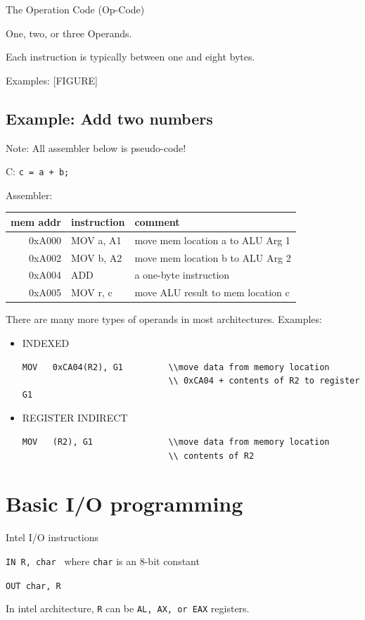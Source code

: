\documentclass{article}	%
\begin{document}
The Operation Code (Op-Code)

One, two, or three Operands.

Each instruction is typically between one and eight bytes.

Examples:           [FIGURE]

\subsection{Example: Add two numbers}
Note:  All assembler below is pseudo-code!

C: {\tt c = a + b;}

Assembler:
\begin{tabular}{|r|l|l|}
\hline
mem addr        & instruction 	& comment\\
\hline
0xA000          & MOV  a, A1   & move mem location a to ALU Arg 1 \\
\hline
0xA002          & MOV  b, A2    & move mem location b to ALU Arg 2 \\
\hline
0xA004          & ADD           & a one-byte instruction \\
\hline
0xA005          & MOV  r, c     & move ALU result to mem location c\\
\hline
\end{tabular}

There are many more types of operands in most architectures.  Examples:

\begin{itemize}
\item INDEXED
\begin{verbatim}
MOV   0xCA04(R2), G1         \\move data from memory location
                             \\ 0xCA04 + contents of R2 to register G1
\end{verbatim}

\item REGISTER INDIRECT
\begin{verbatim}
MOV   (R2), G1        	     \\move data from memory location
                             \\ contents of R2
\end{verbatim}

\end{itemize}


\section{Basic I/O programming}

Intel I/O instructions

{\tt IN         R, char }
where {\tt char} is an 8-bit constant

{\tt OUT        char, R }

In intel architecture, {\tt R} can be {\tt AL, AX, or EAX} registers.
\end{document}
